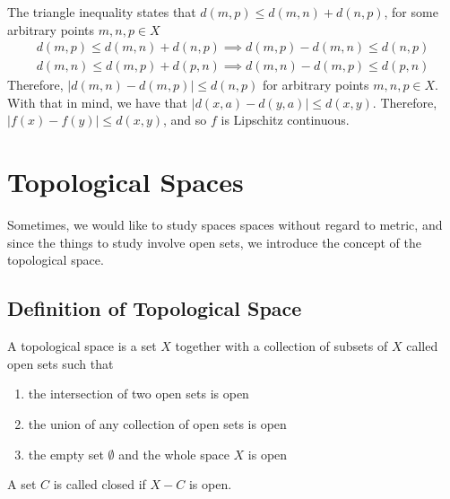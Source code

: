 \documentclass{article}
\begin{document}
	The triangle inequality states that $d(m, p) \leq d(m, n) + d(n, p)$, for some arbitrary points $m, n, p \in X$
	\begin{gather*}
		d(m, p) \leq d(m, n) + d(n, p) \implies d(m, p) - d(m, n) \leq d(n, p) \\
		d(m, n) \leq d(m, p) + d(p, n) \implies d(m, n) - d(m, p) \leq d(p, n)
	\end{gather*}
	Therefore, $|d(m, n) - d(m, p)| \leq d(n, p)$ for arbitrary points $m, n, p \in X$. With that in mind, we have that $|d(x, a) - d(y, a)| \leq d(x, y)$. Therefore, $|f(x) - f(y)| \leq d(x, y)$, and so $f$ is Lipschitz continuous.
	
	\section{Topological Spaces}
	Sometimes, we would like to study spaces spaces without regard to metric, and since the things to study involve open sets, we introduce the concept of the topological space.
	
	\subsection{Definition of Topological Space}
	A topological space is a set $X$ together with a collection of subsets of $X$ called open sets such that
	\begin{enumerate}
		\item the intersection of two open sets is open
		\item the union of any collection of open sets is open
		\item the empty set $\emptyset$ and the whole space $X$ is open
	\end{enumerate}
	A set $C$ is called closed if $X - C$ is open.
	
\end{document}
